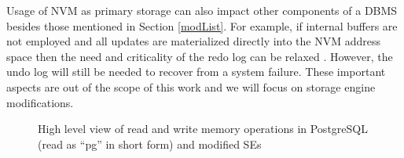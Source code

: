 
Usage of NVM as primary storage can also impact
other components of a DBMS besides those mentioned
in Section \ref{modList}. For example, if internal buffers are not
employed and all updates are materialized directly into the
NVM address space then the need and criticality of the redo
log can be relaxed \cite{huang2014nvram}. However, the undo log will still be
needed to recover from a system failure. These important aspects are
out of the scope of this work and we will focus on storage engine modifications.

\begin{figure*}  %
\centering     %
{}
\caption{High level view of read and write memory operations in PostgreSQL (read as ``pg'' in short form) and modified SEs}
\label{Fig3}
\end{figure*}
 

